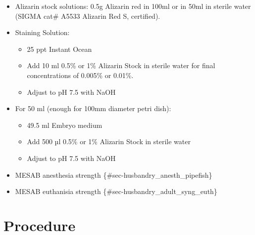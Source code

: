 \documentclass[
  letterpaper,
  DIV=11,
  numbers=noendperiod]{scrreprt}
\providecommand{\tightlist}{%
  \setlength{\itemsep}{0pt}\setlength{\parskip}{0pt}}\usepackage{longtable,booktabs,array}
\begin{document}
\begin{itemize}
\tightlist
\item
  Alizarin stock solutions: 0.5g Alizarin red in 100ml or in 50ml in
  sterile water (SIGMA cat\# A5533 Alizarin Red S, certified).
\item
  Staining Solution:

  \begin{itemize}
  \tightlist
  \item
    25 ppt Instant Ocean
  \item
    Add 10 ml 0.5\% or 1\% Alizarin Stock in sterile water for final
    concentrations of 0.005\% or 0.01\%.
  \item
    Adjust to pH 7.5 with NaOH
  \end{itemize}
\item
  For 50 ml (enough for 100mm diameter petri dish):

  \begin{itemize}
  \tightlist
  \item
    49.5 ml Embryo medium
  \item
    Add 500 µl 0.5\% or 1\% Alizarin Stock in sterile water
  \item
    Adjust to pH 7.5 with NaOH
  \end{itemize}
\item
  MESAB anesthesia strength \{\#sec-husbandry\_anesth\_pipefish\}
\item
  MESAB euthanisia strength \{\#sec-husbandry\_adult\_syng\_euth\}
\end{itemize}

\hypertarget{procedure-80}{%
\section{Procedure}\label{procedure-80}}
\end{document}
